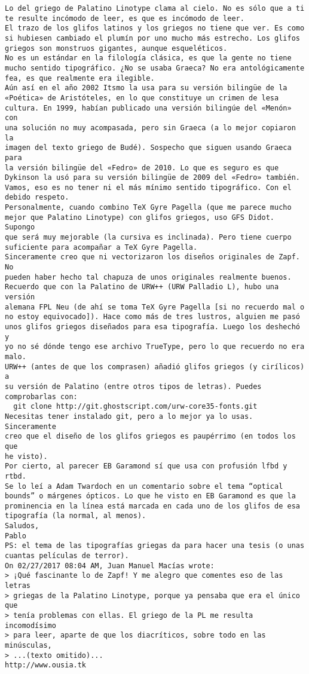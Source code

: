 \documentclass[a4paper,10pt]{article}
\begin{document}
\begin{lstlisting}
Lo del griego de Palatino Linotype clama al cielo. No es sólo que a ti
te resulte incómodo de leer, es que es incómodo de leer.
El trazo de los glifos latinos y los griegos no tiene que ver. Es como
si hubiesen cambiado el plumín por uno mucho más estrecho. Los glifos
griegos son monstruos gigantes, aunque esqueléticos.
No es un estándar en la filología clásica, es que la gente no tiene
mucho sentido tipográfico. ¿No se usaba Graeca? No era antológicamente
fea, es que realmente era ilegible.
Aún así en el año 2002 Itsmo la usa para su versión bilingüe de la
«Poética» de Aristóteles, en lo que constituye un crimen de lesa
cultura. En 1999, habían publicado una versión bilingúe del «Menón» con
una solución no muy acompasada, pero sin Graeca (a lo mejor copiaron la
imagen del texto griego de Budé). Sospecho que siguen usando Graeca para
la versión bilingüe del «Fedro» de 2010. Lo que es seguro es que
Dykinson la usó para su versión bilingüe de 2009 del «Fedro» también.
Vamos, eso es no tener ni el más mínimo sentido tipográfico. Con el
debido respeto.
Personalmente, cuando combino TeX Gyre Pagella (que me parece mucho
mejor que Palatino Linotype) con glifos griegos, uso GFS Didot. Supongo
que será muy mejorable (la cursiva es inclinada). Pero tiene cuerpo
suficiente para acompañar a TeX Gyre Pagella.
Sinceramente creo que ni vectorizaron los diseños originales de Zapf. No
pueden haber hecho tal chapuza de unos originales realmente buenos.
Recuerdo que con la Palatino de URW++ (URW Palladio L), hubo una versión
alemana FPL Neu (de ahí se toma TeX Gyre Pagella [si no recuerdo mal o
no estoy equivocado]). Hace como más de tres lustros, alguien me pasó
unos glifos griegos diseñados para esa tipografía. Luego los deshechó y
yo no sé dónde tengo ese archivo TrueType, pero lo que recuerdo no era malo.
URW++ (antes de que los comprasen) añadió glifos griegos (y cirílicos) a
su versión de Palatino (entre otros tipos de letras). Puedes
comprobarlas con:
  git clone http://git.ghostscript.com/urw-core35-fonts.git
Necesitas tener instalado git, pero a lo mejor ya lo usas. Sinceramente
creo que el diseño de los glifos griegos es paupérrimo (en todos los que
he visto).
Por cierto, al parecer EB Garamond sí que usa con profusión lfbd y rtbd.
Se lo leí a Adam Twardoch en un comentario sobre el tema “optical
bounds” o márgenes ópticos. Lo que he visto en EB Garamond es que la
prominencia en la línea está marcada en cada uno de los glifos de esa
tipografía (la normal, al menos).
Saludos,
Pablo
PS: el tema de las tipografías griegas da para hacer una tesis (o unas
cuantas películas de terror).
On 02/27/2017 08:04 AM, Juan Manuel Macías wrote:
> ¡Qué fascinante lo de Zapf! Y me alegro que comentes eso de las letras
> griegas de la Palatino Linotype, porque ya pensaba que era el único que
> tenía problemas con ellas. El griego de la PL me resulta incomodísimo
> para leer, aparte de que los diacríticos, sobre todo en las minúsculas,
> ...(texto omitido)...
http://www.ousia.tk

\end{lstlisting}
\end{document}
